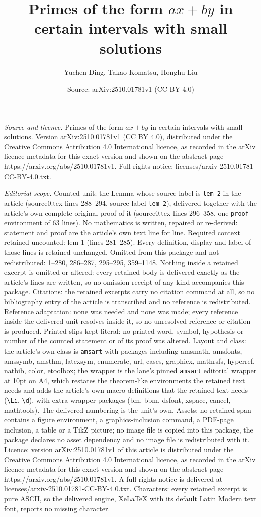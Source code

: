 \documentclass[10pt,a4paper]{amsart}
\title[Primes of the form $ax+by$ in certain intervals with small s]{Primes of the form $ax+by$ in certain intervals with small solutions}
\author{Yuchen Ding, Takao Komatsu, Honghu Liu}
\date{Source: arXiv:2510.01781v1 (CC BY 4.0)}
\begin{document}
\maketitle

\noindent\emph{Source and licence.} Primes of the form $ax+by$ in certain intervals with small solutions. Version arXiv:2510.01781v1 (CC BY 4.0), distributed under the Creative Commons Attribution 4.0 International licence, as recorded in the arXiv licence metadata for this exact version and shown on the abstract page https://arxiv.org/abs/2510.01781v1. Full rights notice: licenses/arxiv-2510.01781-CC-BY-4.0.txt.\par\smallskip

\noindent\textit{Editorial scope.} Counted unit: the Lemma whose source label is \texttt{lem-2} in the article (source0.tex lines 288--294, source label \texttt{lem-2}), delivered together with the article's own complete original proof of it (source0.tex lines 296--358, one \texttt{proof} environment of 63 lines). No mathematics is written, repaired or re-derived: statement and proof are the article's own text line for line. Required context retained uncounted: lem-1 (lines 281--285). Every definition, display and label of those lines is retained unchanged. Omitted from this package and not redistributed: 1--280, 286--287, 295--295, 359--1148. Nothing inside a retained excerpt is omitted or altered: every retained body is delivered exactly as the article's lines are written, so no omission receipt of any kind accompanies this package. Citations: the retained excerpts carry no citation command at all, so no bibliography entry of the article is transcribed and no reference is redistributed. Reference adaptation: none was needed and none was made; every reference inside the delivered unit resolves inside it, so no unresolved reference or citation is produced. Printed slips kept literal: no printed word, symbol, hypothesis or number of the counted statement or of its proof was altered. Layout and class: the article's own class is \texttt{amsart} with packages including amsmath, amsfonts, amssymb, amsthm, latexsym, enumerate, url, cases, graphicx, mathrsfs, hyperref, natbib, color, etoolbox; the wrapper is the lane's pinned \texttt{amsart} editorial wrapper at 10pt on A4, which restates the theorem-like environments the retained text needs and adds the article's own macro definitions that the retained text needs (\texttt{\textbackslash Li}, \texttt{\textbackslash d}), with extra wrapper packages (bm, bbm, dsfont, xspace, cancel, mathtools). The delivered numbering is the unit's own. Assets: no retained span contains a figure environment, a graphics-inclusion command, a PDF-page inclusion, a table or a TikZ picture; no image file is copied into this package, the package declares no asset dependency and no image file is redistributed with it. Licence: version arXiv:2510.01781v1 of this article is distributed under the Creative Commons Attribution 4.0 International licence, as recorded in the arXiv licence metadata for this exact version and shown on the abstract page https://arxiv.org/abs/2510.01781v1. A full rights notice is delivered at licenses/arxiv-2510.01781-CC-BY-4.0.txt. Characters: every retained excerpt is pure ASCII, so the delivered engine, XeLaTeX with its default Latin Modern text font, reports no missing character.
\end{document}
